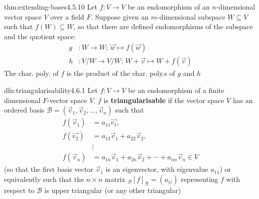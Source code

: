 \documentclass[landscape, 8pt]{extarticle}
\begin{document}
\begin{multicols}{3}
\vspace{-5pt}
\begin{thm}{thm:extending-bases}{4.5.10}
    \vspace{-5pt}
    Let $f : V\to V$ be an endomorphism of an $n$-dimensional vector space $V$ over a field $F$. Suppose given an $m$-dimensional subspace $W\subseteq V$ such that $f(W)\subseteq W$, so that there are defined endomorphisms of the subspace and the quotient space:
    \begin{align*}
        g &: W \to W;\, \vec{w}\mapsto f(\vec{w})\\
        h &: V / W \to V / W;\, W + \vec{v} \mapsto W + f(\vec{v})
    \end{align*}
    The char. poly. of $f$ is the product of the char. poly.s of $g$ and $h$
\end{thm}

\vspace{-5pt}
\begin{dfn}[Triangularisability]{dfn:triangularisability}{4.6.1}
    \vspace{-5pt}
    Let $f : V \to V$ be an endomorphism of a finite dimensional $F$-vector space $V$. $f$ is \textbf{triangularisable} if the vector space $V$ has an ordered basis $\mathcal{B} = (\vec{v}_{1}, \vec{v}_{2},\dots,\vec{v}_{n})$ such that
        \begin{align*}
            f(\vec{v}_{1}) &= a_{11}\vec{v_{1}}, \\
            f(\vec{v_{2}}) &= a_{12}\vec{v}_{1} + a_{22}\vec{v}_{2}, \\
            &\vdots \\
            f(\vec{v}_{n}) &= a_{1n}\vec{v}_{1} + a_{2n}\vec{v}_{2} + \cdots + a_{nn}\vec{v}_{n}\in V
        \end{align*}
        (so that the first basis vector $\vec{v}_{1}$ is an eigenvector, with eigenvalue $a_{11}$) or equivalently such that the $n \times n$ matrix $_{\mathcal{B}}[f]_{\mathcal{B}} = (a_{ij})$ representing $f$ with respect to $\mathcal{B}$ is upper triangular (or any other triangular)
\end{dfn}


\end{multicols}
\end{document}
